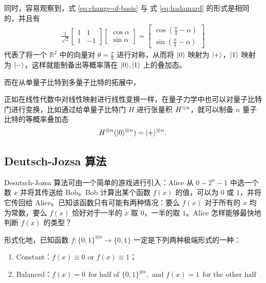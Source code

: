 同时，容易观察到，式 \ref{eq:change-of-basis} 与 式 \ref{eq:hadamard} 的形式是相同的，并且有 \begin{align*}
    \frac{1}{\sqrt{2}}\begin{bmatrix}
        1 & 1\\
        1 & -1
    \end{bmatrix}
    \begin{bmatrix}
        \cos\alpha\\
        \sin\alpha
    \end{bmatrix}
    =\begin{bmatrix}
        \cos(\frac{\pi}{4}-\alpha)\\
        \sin(\frac{\pi}{4}-\alpha)
    \end{bmatrix}
\end{align*} 代表了将一个 $\mathbb{R}^2$ 中的向量对 $\theta=\frac{\pi}{8}$ 进行对称，从而将 $|0\rangle$ 映射为 $|+\rangle$，$|1\rangle$ 映射为 $|-\rangle$，这样就能制备出等概率落在 $|0\rangle,|1\rangle$ 上的叠加态。

而在从单量子比特到多量子比特的拓展中，



正如在线性代数中对线性映射进行线性变换一样，在量子力学中也可以对量子比特门进行变换，比如通过给单量子比特门 $H$ 进行张量积 $H^{\otimes n}$，就可以制备 $n$ 量子比特的等概率叠加态 \begin{align*}
    H^{\otimes n}(|0\rangle^{\otimes n})=|+\rangle^{\otimes n}.
\end{align*}




\subsection{Deutsch-Jozsa 算法}

Desutsch-Jozsa 算法可由一个简单的游戏进行引入：Alice 从 $0-2^{n}-1$ 中选一个数 $x$ 并将其传送给 Bob。Bob 计算出某个函数 $f(x)$ 的值，可以为 $0$ 或 $1$，并将它传回给 Alice。已知该函数只有可能有两种情况：要么 $f(x)$ 对于所有的 $x$ 均为常数，要么 $f(x)$ 恰好对于一半的 $x$ 取 $0$，一半的取 $1$。Alice 怎样能够最快地判断 $f(x)$ 的类型？

形式化地，已知函数 $f:\{0,1\}^{\otimes n}\rightarrow\{0,1\}$ 一定是下列两种极端形式的一种：
\begin{enumerate}
    \item Constant：$f(x)\equiv 0\text{ or }f(x)\equiv 1$；
    \item Balanced：$f(x)=0~~\text{for half of }\{0,1\}^{\otimes n},\text{ and }f(x)=1~~\text{for the other half}$
\end{enumerate}

